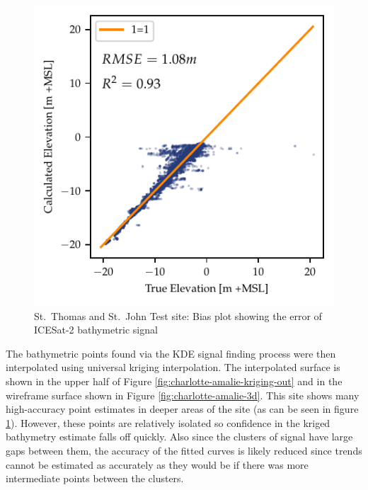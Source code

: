 \begin{figure}[htbp]
    \centering
    \includegraphics{figures/charlotteamalie_lidar_estimated_vs_truth.pdf}
    \caption{St.~Thomas and St.~John Test site: Bias plot showing the error of ICESat-2 bathymetric signal}
    \label{fig:charlotte-amalie-biasplot}
\end{figure}

The bathymetric points found via the KDE signal finding process were then interpolated using universal kriging interpolation. The interpolated surface is shown in the upper half of Figure \ref{fig:charlotte-amalie-kriging-out} and in the wireframe surface shown in Figure \ref{fig:charlotte-amalie-3d}. This site shows many high-accuracy point estimates in deeper areas of the site (as can be seen in figure \ref{fig:charlotte-amalie-biasplot}). However, these points are relatively isolated so confidence in the kriged bathymetry estimate falls off quickly. Also since the clusters of signal have large gaps between them, the accuracy of the fitted curves is likely reduced since trends cannot be estimated as accurately as they would be if there was more intermediate points between the clusters.

